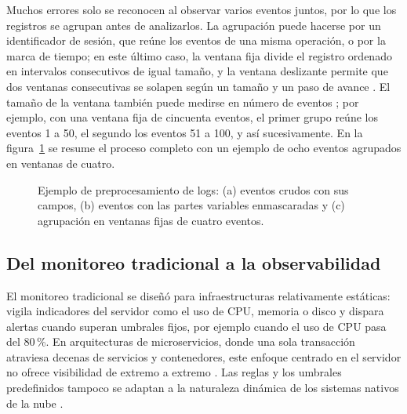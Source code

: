 Muchos errores solo se reconocen al observar varios eventos juntos, por lo que los registros se agrupan antes de analizarlos. La agrupación puede hacerse por un identificador de sesión, que reúne los eventos de una misma operación, o por la marca de tiempo; en este último caso, la ventana fija divide el registro ordenado en intervalos consecutivos de igual tamaño, y la ventana deslizante permite que dos ventanas consecutivas se solapen según un tamaño y un paso de avance \cite{he2021_survey}. El tamaño de la ventana también puede medirse en número de eventos \cite{lim2025_logadreft}; por ejemplo, con una ventana fija de cincuenta eventos, el primer grupo reúne los eventos 1 a 50, el segundo los eventos 51 a 100, y así sucesivamente. En la figura~\ref{fig:ant_preprocesamiento} se resume el proceso completo con un ejemplo de ocho eventos agrupados en ventanas de cuatro.

\begin{figure}[H]
\centering

\caption{Ejemplo de preprocesamiento de logs: (a) eventos crudos con sus campos, (b) eventos con las partes variables enmascaradas y (c) agrupación en ventanas fijas de cuatro eventos.}
\label{fig:ant_preprocesamiento}
\end{figure}

\subsection{Del monitoreo tradicional a la observabilidad}\label{sec:ant_observabilidad}

El monitoreo tradicional se diseñó para infraestructuras relativamente estáticas: vigila indicadores del servidor como el uso de CPU, memoria o disco y dispara alertas cuando superan umbrales fijos, por ejemplo cuando el uso de CPU pasa del 80\,\%. En arquitecturas de microservicios, donde una sola transacción atraviesa decenas de servicios y contenedores, este enfoque centrado en el servidor no ofrece visibilidad de extremo a extremo \cite{nellutla2026_observability}. Las reglas y los umbrales predefinidos tampoco se adaptan a la naturaleza dinámica de los sistemas nativos de la nube \cite{wang2025_cloudnative_rca}.

